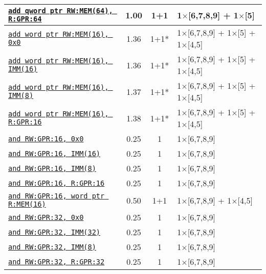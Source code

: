 \documentclass[a4paper,english,fontsize=9]{scrartcl}
\begin{document}
\begin{longtable}{p{}ccL{.25\textwidth}}
  \texttt{\href{https://felixcloutier.com/x86/ADD.html}{add qword ptr RW:MEM(64), R:GPR:64}} & 1.00 & 1+1 & 1\(\times\)[6,7,8,9] + 1\(\times\)[5] \\
  \midrule
  \texttt{\href{https://felixcloutier.com/x86/ADD.html}{add word ptr RW:MEM(16), 0x0}} & 1.36 & 1+1* & 1\(\times\)[6,7,8,9] + 1\(\times\)[5] + 1\(\times\)[4,5] \\
  \midrule
  \texttt{\href{https://felixcloutier.com/x86/ADD.html}{add word ptr RW:MEM(16), IMM(16)}} & 1.36 & 1+1* & 1\(\times\)[6,7,8,9] + 1\(\times\)[5] + 1\(\times\)[4,5] \\
  \midrule
  \texttt{\href{https://felixcloutier.com/x86/ADD.html}{add word ptr RW:MEM(16), IMM(8)}} & 1.37 & 1+1* & 1\(\times\)[6,7,8,9] + 1\(\times\)[5] + 1\(\times\)[4,5] \\
  \midrule
  \texttt{\href{https://felixcloutier.com/x86/ADD.html}{add word ptr RW:MEM(16), R:GPR:16}} & 1.38 & 1+1* & 1\(\times\)[6,7,8,9] + 1\(\times\)[5] + 1\(\times\)[4,5] \\
  \midrule
  \texttt{\href{https://felixcloutier.com/x86/AND.html}{and RW:GPR:16, 0x0}} & 0.25 & 1 & 1\(\times\)[6,7,8,9] \\
  \midrule
  \texttt{\href{https://felixcloutier.com/x86/AND.html}{and RW:GPR:16, IMM(16)}} & 0.25 & 1 & 1\(\times\)[6,7,8,9] \\
  \midrule
  \texttt{\href{https://felixcloutier.com/x86/AND.html}{and RW:GPR:16, IMM(8)}} & 0.25 & 1 & 1\(\times\)[6,7,8,9] \\
  \midrule
  \texttt{\href{https://felixcloutier.com/x86/AND.html}{and RW:GPR:16, R:GPR:16}} & 0.25 & 1 & 1\(\times\)[6,7,8,9] \\
  \midrule
  \texttt{\href{https://felixcloutier.com/x86/AND.html}{and RW:GPR:16, word ptr R:MEM(16)}} & 0.50 & 1+1 & 1\(\times\)[6,7,8,9] + 1\(\times\)[4,5] \\
  \midrule
  \texttt{\href{https://felixcloutier.com/x86/AND.html}{and RW:GPR:32, 0x0}} & 0.25 & 1 & 1\(\times\)[6,7,8,9] \\
  \midrule
  \texttt{\href{https://felixcloutier.com/x86/AND.html}{and RW:GPR:32, IMM(32)}} & 0.25 & 1 & 1\(\times\)[6,7,8,9] \\
  \midrule
  \texttt{\href{https://felixcloutier.com/x86/AND.html}{and RW:GPR:32, IMM(8)}} & 0.25 & 1 & 1\(\times\)[6,7,8,9] \\
  \midrule
  \texttt{\href{https://felixcloutier.com/x86/AND.html}{and RW:GPR:32, R:GPR:32}} & 0.25 & 1 & 1\(\times\)[6,7,8,9] \\

\end{longtable}
\end{document}

